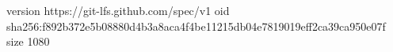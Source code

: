 version https://git-lfs.github.com/spec/v1
oid sha256:f892b372e5b08880d4b3a8aca4f4be11215db04e7819019eff2ca39ca950e07f
size 1080

